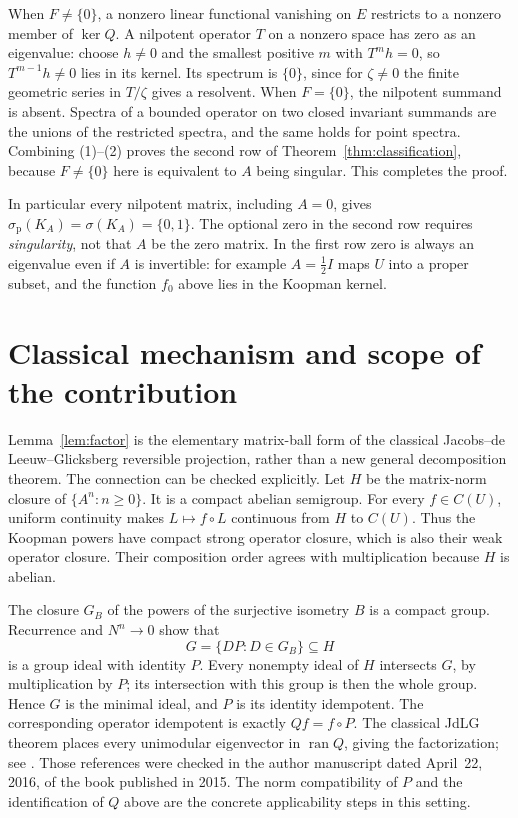 \documentclass[11pt]{article}
\newcommand{\spoint}{\sigma_{\mathrm p}}
\DeclareMathOperator{\ran}{ran}
\begin{document}
When \(F\neq\{0\}\), a nonzero linear functional vanishing on \(E\)
restricts to a nonzero member of \(\ker Q\).
A nilpotent operator \(T\) on a nonzero space has zero as an eigenvalue:
choose \(h\neq0\) and the smallest positive \(m\) with \(T^m h=0\), so
\(T^{m-1}h\neq0\) lies in its kernel. Its spectrum is \(\{0\}\), since
for \(\zeta\neq0\) the finite geometric series in \(T/\zeta\) gives a
resolvent. When \(F=\{0\}\), the nilpotent summand is absent.
Spectra of a bounded operator on two closed invariant summands are the
unions of the restricted spectra, and the same holds for point spectra.
Combining (1)--(2) proves the second row of
Theorem~\ref{thm:classification}, because \(F\neq\{0\}\) here is equivalent
to \(A\) being singular. This completes the proof.

In particular every nilpotent matrix, including \(A=0\), gives
\(\spoint(K_A)=\sigma(K_A)=\{0,1\}\).
The optional zero in the second row requires \emph{singularity}, not that
\(A\) be the zero matrix.
In the first row zero is always an eigenvalue even if \(A\) is invertible:
for example \(A=\tfrac12 I\) maps \(U\) into a proper subset, and the
function \(f_0\) above lies in the Koopman kernel.

\section{Classical mechanism and scope of the contribution}

Lemma~\ref{lem:factor} is the elementary matrix-ball form of the classical
Jacobs--de Leeuw--Glicksberg reversible projection, rather than a new
general decomposition theorem. The connection can be checked explicitly.
Let \(H\) be the matrix-norm closure of \(\{A^n:n\geq0\}\).
It is a compact abelian semigroup. For every \(f\in C(U)\),
uniform continuity makes \(L\mapsto f\circ L\) continuous from \(H\)
to \(C(U)\). Thus the Koopman powers have compact strong operator closure,
which is also their weak operator closure.
Their composition order agrees with multiplication because \(H\) is
abelian.

The closure \(G_B\) of the powers of the surjective isometry \(B\) is a
compact group. Recurrence and \(N^n\to0\) show that
\[
 G=\{DP:D\in G_B\}\subseteq H
\]
is a group ideal with identity \(P\). Every nonempty ideal of \(H\)
intersects \(G\), by multiplication by \(P\); its intersection with this
group is then the whole group. Hence \(G\) is the minimal ideal, and \(P\)
is its identity idempotent. The corresponding operator idempotent is
exactly \(Qf=f\circ P\).
The classical JdLG theorem places every unimodular eigenvector in
\(\ran Q\), giving the factorization; see
\cite[construction on printed pp.~308--309 and
Theorem~16.33(a), printed p.~313]{EFHN}.
Those references were checked in the author manuscript dated
April~22, 2016, of the book published in 2015.
The norm compatibility of \(P\) and the identification of \(Q\) above
are the concrete applicability steps in this setting.
\end{document}
